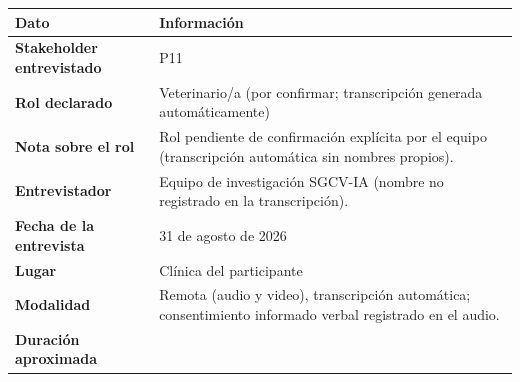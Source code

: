 \documentclass[
]{article}
\newcounter{none} %
\begin{document}
{\def\LTcaptype{none} %
\begin{longtable}[]{|
  >{\raggedright\arraybackslash}p{}|
  >{\raggedright\arraybackslash}p{}|}
\hline
\begin{minipage}[b]{\linewidth}\centering
\textbf{Dato}
\end{minipage} & \begin{minipage}[b]{\linewidth}\centering
\textbf{Información}
\end{minipage} \\
\hline
\endhead
\hline
\endlastfoot
\textbf{Stakeholder entrevistado} & \begin{minipage}[t]{\linewidth}\raggedright
P11
\end{minipage} \\
\hline
\textbf{Rol declarado} & \begin{minipage}[t]{\linewidth}\raggedright
Veterinario/a (por confirmar; transcripción generada automáticamente)
\end{minipage} \\
\hline
\textbf{Nota sobre el rol} & \begin{minipage}[t]{\linewidth}\raggedright
Rol pendiente de confirmación explícita por el equipo (transcripción automática sin nombres propios).
\end{minipage} \\
\hline
\textbf{Entrevistador} & \begin{minipage}[t]{\linewidth}\raggedright
Equipo de investigación SGCV-IA (nombre no registrado en la transcripción).
\end{minipage} \\
\hline
\textbf{Fecha de la entrevista} & \begin{minipage}[t]{\linewidth}\raggedright
31 de agosto de 2026
\end{minipage} \\
\hline
\textbf{Lugar} & \begin{minipage}[t]{\linewidth}\raggedright
Clínica del participante
\end{minipage} \\
\hline
\textbf{Modalidad} & \begin{minipage}[t]{\linewidth}\raggedright
Remota (audio y video), transcripción automática; consentimiento informado verbal registrado en el audio.
\end{minipage} \\
\hline
\textbf{Duración aproximada} & \begin{minipage}[t]{\linewidth}\raggedright

\end{minipage}
\end{longtable}}
\end{document}
